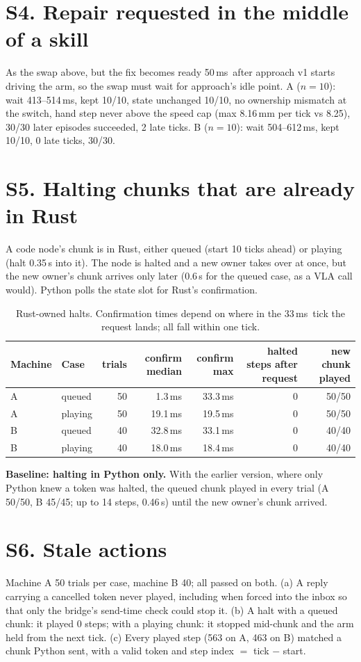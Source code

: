 \documentclass[10pt,letterpaper]{article}
\newcommand{\ms}{\,ms}
\begin{document}
\section*{S4. Repair requested in the middle of a skill}
As the swap above, but the fix becomes ready 50\ms\ after approach v1 starts driving the arm, so the swap must wait for approach's idle point. A ($n{=}10$): wait 413--514\ms, kept 10/10, state unchanged 10/10, no ownership mismatch at the switch, hand step never above the speed cap (max 8.16\,mm per tick vs 8.25), 30/30 later episodes succeeded, 2 late ticks. B ($n{=}10$): wait 504--612\ms, kept 10/10, 0 late ticks, 30/30.

\section*{S5. Halting chunks that are already in Rust}
A code node's chunk is in Rust, either queued (start 10 ticks ahead) or playing (halt 0.35\,s into it). The node is halted and a new owner takes over at once, but the new owner's chunk arrives only later (0.6\,s for the queued case, as a VLA call would). Python polls the state slot for Rust's confirmation.

\begin{table}[h]
\centering\small
\begin{tabular}{llrrrrr}
\toprule
Machine & Case & trials & confirm median & confirm max & halted steps after request & new chunk played\\
\midrule
A & queued & 50 & 1.3\ms & 33.3\ms & 0 & 50/50\\
A & playing & 50 & 19.1\ms & 19.5\ms & 0 & 50/50\\
B & queued & 40 & 32.8\ms & 33.1\ms & 0 & 40/40\\
B & playing & 40 & 18.0\ms & 18.4\ms & 0 & 40/40\\
\bottomrule
\end{tabular}
\caption{Rust-owned halts. Confirmation times depend on where in the 33\ms\ tick the request lands; all fall within one tick.}
\end{table}

\textbf{Baseline: halting in Python only.} With the earlier version, where only Python knew a token was halted, the queued chunk played in every trial (A 50/50, B 45/45; up to 14 steps, 0.46\,s) until the new owner's chunk arrived.

\section*{S6. Stale actions}
Machine A 50 trials per case, machine B 40; all passed on both. (a) A reply carrying a cancelled token never played, including when forced into the inbox so that only the bridge's send-time check could stop it. (b) A halt with a queued chunk: it played 0 steps; with a playing chunk: it stopped mid-chunk and the arm held from the next tick. (c) Every played step (563 on A, 463 on B) matched a chunk Python sent, with a valid token and step index $=$ tick $-$ start.
\end{document}
